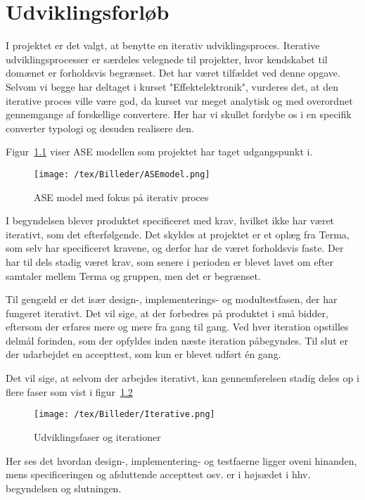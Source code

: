 \chapter{Udviklingsforløb}
I projektet er det valgt, at benytte en iterativ udviklingsproces. Iterative udviklingsprocesser er særdeles velegnede til projekter, hvor kendskabet til domænet er forholdsvis begrænset. Det har været tilfældet ved denne opgave. Selvom vi begge har deltaget i kurset "Effektelektronik", vurderes det, at den iterative proces ville være god, da kurset var meget analytisk og med overordnet gennemgange af forskellige convertere. Her har vi skullet fordybe os i en specifik converter typologi og desuden realisere den.


Figur~\ref{fig:ASE} viser ASE modellen som projektet har taget udgangspunkt i. 
\begin{figure}[H]
	\center
	\texttt{[image: /tex/Billeder/ASEmodel.png]}
	\caption{ASE model med fokus på iterativ proces~\cite{udviklingsproces}}
	\label{fig:ASE}
\end{figure} 
I begyndelsen blever produktet specificeret med krav, hvilket ikke har været iterativt, som det efterfølgende. Det skyldes at projektet er et oplæg fra Terma, som selv har specificeret kravene, og derfor har de været forholdsvis faste. Der har til dels stadig været krav, som senere i perioden er blevet lavet om efter samtaler mellem Terma og gruppen, men det er begrænset.

Til gengæld er det især design-, implementerings- og modultestfasen, der har fungeret iterativt. Det vil sige, at der forbedres på produktet i små bidder, eftersom der erfares mere og mere fra gang til gang. Ved hver iteration opstilles delmål forinden, som der opfyldes inden næste iteration påbegyndes. 
Til slut er der udarbejdet en accepttest, som kun er blevet udført én gang.

Det vil sige, at selvom der arbejdes iterativt, kan gennemførelsen stadig deles op i flere faser som vist i figur~\ref{fig:Iterative} 
\begin{figure}[H]
	\center
	\texttt{[image: /tex/Billeder/Iterative.png]}
	\caption{Udviklingsfaser og iterationer~\cite{udviklingsproces}}
	\label{fig:Iterative}
\end{figure} 
Her ses det hvordan design-, implementering- og testfaerne ligger oveni hinanden, mens specificeringen og afsluttende accepttest osv. er i højsædet i hhv. begyndelsen og slutningen.



